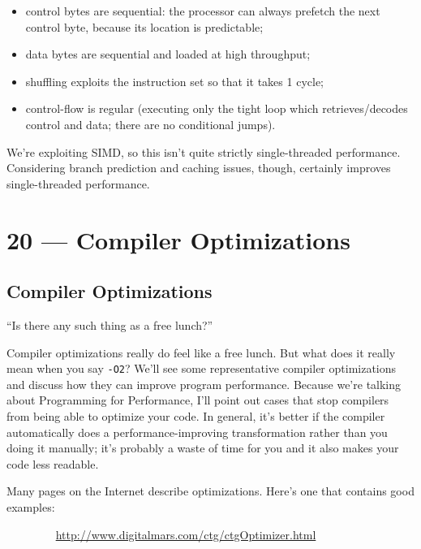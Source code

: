 \documentclass[a4paper]{report}
\begin{document}
\begin{itemize}[noitemsep]
\item control bytes are sequential: the processor can always prefetch the next control byte, because
its location is predictable;
\item data bytes are sequential and loaded at high throughput;
\item shuffling exploits the instruction set so that it takes 1 cycle;
\item control-flow is regular (executing only the tight loop which retrieves/decodes control
and data; there are no conditional jumps).
\end{itemize}
We're exploiting SIMD, so this isn't quite strictly single-threaded performance.
Considering branch prediction and caching issues, though,
certainly improves single-threaded performance.










\chapter*{20 --- Compiler Optimizations}


\section*{Compiler Optimizations}

\hfill ``Is there any such thing as a free lunch?''

Compiler optimizations really do feel like a free lunch.
But what does it really mean when you say {\tt -O2}?
We'll see some representative compiler optimizations and discuss how
they can improve program performance. Because we're talking about
Programming for Performance, I'll point out cases that stop compilers
from being able to optimize your code. In general, it's better if the
compiler automatically does a performance-improving transformation
rather than you doing it manually; it's probably a waste of time for
you and it also makes your code less readable.

Many pages on the Internet describe
optimizations. Here's one that contains good examples:

$\qquad \qquad$ \url{http://www.digitalmars.com/ctg/ctgOptimizer.html}
\end{document}

